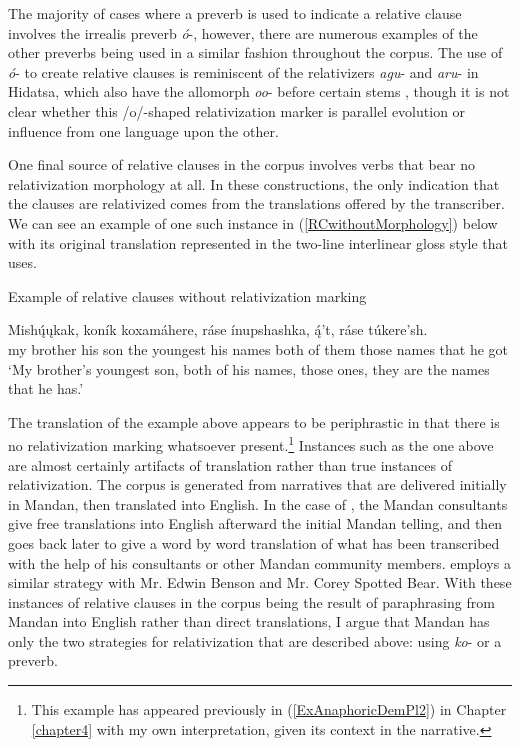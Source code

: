 The majority of cases where a preverb is used to indicate a relative clause involves the irrealis preverb \textit{ó}-, however, there are numerous examples of the other preverbs being used in a similar fashion throughout the corpus. The use of \textit{ó}- to create relative clauses is reminiscent of the relativizers \textit{agu}- and \textit{aru}- in Hidatsa, which also have the allomorph \textit{oo}- before certain stems \citep[40]{boyle2007}, though it is not clear whether this /o/-shaped relativization marker is parallel evolution or influence from one language upon the other. 

One final source of relative clauses in the corpus involves verbs that bear no relativization morphology at all. In these constructions, the only indication that the clauses are relativized comes from the translations offered by the transcriber. We can see an example of one such instance in (\ref{RCwithoutMorphology}) below with its original translation represented in the two-line interlinear gloss style that \citet[61]{hollow1973a} uses.

\begin{exe}
    \item\label{RCwithoutMorphology} Example of relative clauses without relativization marking
    
    \gll Mishų́ųkak, koník  koxamáhere, ráse ínupshashka, ą́'t, ráse túkere'sh.\\
    \textnormal{my brother} \textnormal{his son} \textnormal{the youngest} \textnormal{his names} \textnormal{both of them} \textnormal{those} \textnormal{names} \textnormal{that he got}\\
    \glt `My brother's youngest son, both of his names, those ones, they are the names that he has.' \citep[61]{hollow1973a}
\end{exe}

The translation of the example above appears to be periphrastic in that there is no relativization marking whatsoever present.\footnote{This example has appeared previously in (\ref{ExAnaphoricDemPl2}) in Chapter \ref{chapter4} with my own interpretation, given its context in the narrative.} Instances such as the one above are almost certainly artifacts of translation rather than true instances of relativization. The corpus is generated from narratives that are delivered initially in Mandan, then translated into English. In the case of \citet{hollow1973a}, the Mandan consultants give free translations into English afterward the initial Mandan telling, and then \citeauthor{hollow1973a} goes back later to give a word by word translation of what has been transcribed with the help of his consultants or other Mandan community members. \citet{trechter2012,trechter2012b} employs a similar strategy with Mr. Edwin Benson and Mr. Corey Spotted Bear. With these instances of relative clauses in the corpus being the result of paraphrasing from Mandan into English rather than direct translations, I argue that Mandan has only the two strategies for relativization that are described above: using \textit{ko}- or a preverb.

